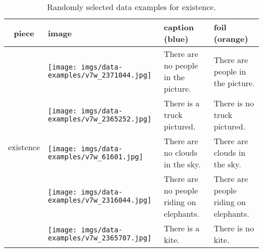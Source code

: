 \documentclass[11pt]{article}
\newcommand{\gr}[1]{\textcolor{niceblue}{#1}}
\newcommand\red[1]{\textcolor{niceorange}{#1}}
\begin{document}
\begin{table*}[t]
    \small
    \centering
    
\begin{tabular}{cp{.3\linewidth}b{.25\linewidth}b{.25\linewidth}}
      \toprule
      \bf piece & \bf image & \bf caption (\gr{blue}) & \bf foil (\red{orange}) \\
      \midrule
      \multirow{5}{*}{existence} & \texttt{[image: imgs/data-examples/v7w\_2371044.jpg]}
      & There are \gr{no} people in the picture. & There are people in the picture.\\
      \cmidrule{2-4}
      & \texttt{[image: imgs/data-examples/v7w\_2365252.jpg]}
      & There is a truck pictured. & There is \red{no} truck pictured. \\
      \cmidrule{2-4}
      & \texttt{[image: imgs/data-examples/v7w\_61601.jpg]}
      & There are \gr{no} clouds in the sky. & There are clouds in the sky. \\
      \cmidrule{2-4}
      & \texttt{[image: imgs/data-examples/v7w\_2316044.jpg]}
      & There are \gr{no} people riding on elephants. & There are people riding on elephants. \\
      \cmidrule{2-4}
        & \texttt{[image: imgs/data-examples/v7w\_2365707.jpg]}
      & There is a kite. & There is \red{no} kite. \\
      \bottomrule
    \end{tabular}
\caption{Randomly selected data examples for existence.}
    \label{tab:existence-examples}
\end{table*}
\end{document}
